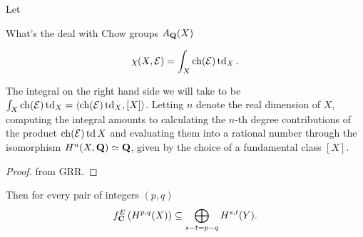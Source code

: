 \begin{theorem}
    \label{Grothendieck-Riemann-Roch}
    Let
\end{theorem}

\begin{remark}
    What's the deal with Chow groups $A_\mathbf Q(X)$    
\end{remark}

\begin{corollary}
    \label{Hirzebruch-Riemann-Roch}
    \[
        \chi(X, \E) = \int_X \ch{\E}\tdclass{X}.
    \]
\end{corollary}

\begin{remark}
    The integral on the right hand side we will take to be $\int_X \ch{\E}\tdclass{X} = \pairing{\ch{\E}\tdclass{X}}{[X]}$. 
    Letting $n$ denote the real dimension of $X$, computing the integral amounts to calculating the $n$-th degree contributions of the product $\ch{\E}\td{X}$ and evaluating them into a rational number through the isomorphism $H^{n}(X, \mathbf Q) \simeq \mathbf Q$, given by the choice of a fundamental class $[X]$.
\end{remark}

\begin{proof}
    from GRR.
\end{proof}

\begin{proposition}
    \label{Hodge lattice, fm transform interaction}
    Then for every pair of integers $(p,q)$
    \begin{equation}
        \label{eq: Hodge lattice, fm transform}
        f^{E}_\mathbf C\left(H^{p,q}(X)\right) \subseteq \bigoplus_{s - t = p - q} H^{s,t}(Y).
    \end{equation}
\end{proposition}